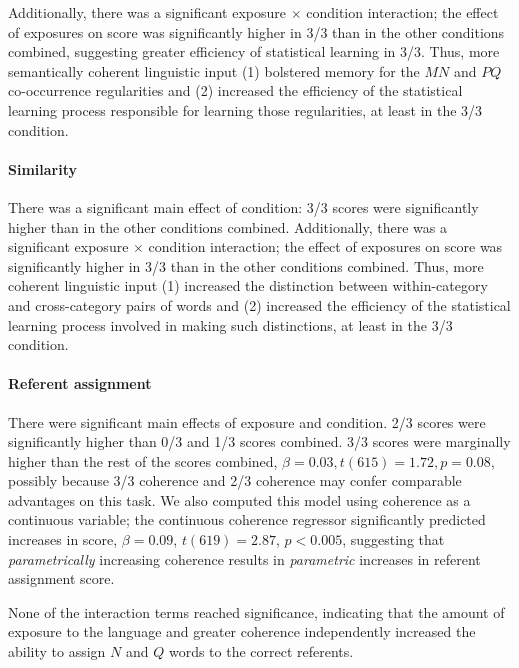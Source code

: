 \documentclass[man,floatsintext]{apa6}
\begin{document}
Additionally, there was a significant exposure $\times$ condition interaction; the effect of exposures on score was significantly higher in 3/3 than in the other conditions combined, suggesting greater efficiency of statistical learning in 3/3. Thus, more semantically coherent linguistic input (1) bolstered memory for the $MN$ and $PQ$ co-occurrence regularities and (2) increased the efficiency of the statistical learning process responsible for learning those regularities, at least in the 3/3 condition.

\paragraph{Similarity} There was a significant main effect of condition: 3/3 scores were significantly higher than in the other conditions combined. Additionally, there was a significant exposure $\times$ condition interaction; the effect of exposures on score was significantly higher in 3/3 than in the other conditions combined. Thus, more coherent linguistic input (1) increased the distinction between within-category and cross-category pairs of words and (2) increased the efficiency of the statistical learning process involved in making such distinctions, at least in the 3/3 condition.

\paragraph{Referent assignment}

There were significant main effects of exposure and condition. 2/3 scores were significantly higher than 0/3 and 1/3 scores combined. 3/3 scores were marginally higher than the rest of the scores combined, $\beta = 0.03, t(615) = 1.72, p = 0.08$, possibly because 3/3 coherence and 2/3 coherence may confer comparable advantages on this task. We also computed this model using coherence as a continuous variable; the continuous coherence regressor significantly predicted increases in score, $\beta = 0.09$, $t(619) = 2.87$, $p < 0.005$, suggesting that \emph{parametrically} increasing coherence results in \emph{parametric} increases in referent assignment score.

None of the interaction terms reached significance, indicating that the amount of exposure to the language and greater coherence independently increased the ability to assign $N$ and $Q$ words to the correct referents.

\end{document}
